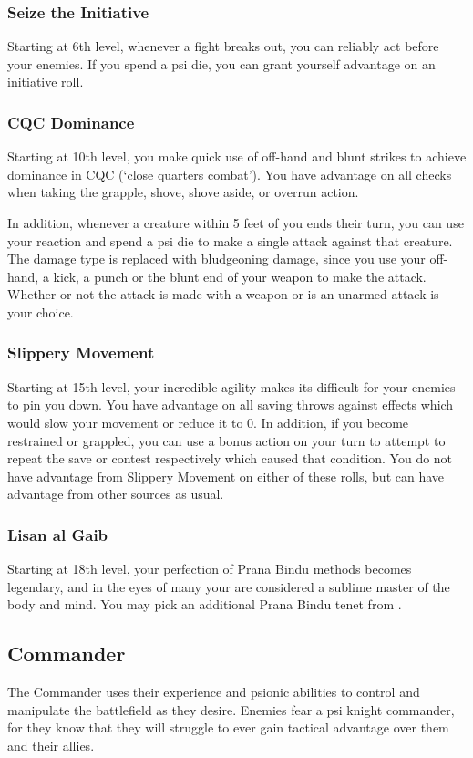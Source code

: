 \subsubsection{Seize the Initiative}
Starting at 6th level,
whenever a fight breaks out,
you can reliably act before your enemies.
If you spend a psi die,
you can grant yourself advantage on an initiative roll.

\subsubsection{CQC Dominance}
Starting at 10th level,
you make quick use of off-hand and blunt strikes to
achieve dominance in CQC (`close quarters combat').
You have advantage on all checks when taking the
grapple, shove, shove aside, or overrun action.

In addition,
whenever a creature within 5 feet of you ends their turn,
you can use your reaction and spend a psi die
to make a single attack against that creature.
The damage type is replaced with bludgeoning damage,
since you use your off-hand,
a kick, a punch or the blunt end of your weapon
to make the attack.
Whether or not the attack is made with a weapon
or is an unarmed attack is your choice.

\subsubsection{Slippery Movement}
Starting at 15th level,
your incredible agility makes its difficult for your
enemies to pin you down.
You have advantage on all saving throws against effects
which would slow your movement or reduce it to 0.
In addition,
if you become restrained or grappled,
you can use a bonus action on your turn
to attempt to repeat the save
or contest respectively which caused that condition.
You do not have advantage from Slippery Movement
on either of these rolls,
but can have advantage from other sources as usual.

\subsubsection{Lisan al Gaib}
Starting at 18th level,
your perfection of Prana Bindu methods becomes legendary,
and in the eyes of many your are considered a
sublime master of the body and mind.
You may pick an additional Prana Bindu tenet from
.

\subsection{Commander}
The Commander uses their experience and psionic abilities
to control and manipulate the battlefield as they desire.
Enemies fear a psi knight commander,
for they know that they will struggle to ever
gain tactical advantage over them and their allies.

